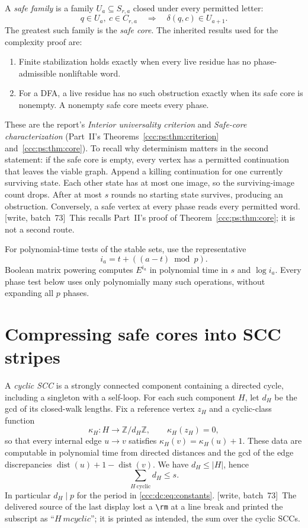 \documentclass[11pt,letterpaper]{article}
\theoremstyle{definition}
\theoremstyle{remark}
\newcommand{\wsevthree}{\textup{[write, batch~73]}}
\begin{document}
A \emph{safe family} is a family $U_a\subseteq S_{r,a}$ closed under every permitted letter:
\[
q\in U_a,\ c\in C_{r,a}\quad\Longrightarrow\quad\delta(q,c)\in U_{a+1}.
\]
The greatest such family is the \emph{safe core}. The inherited results used for the complexity proof are:
\begin{enumerate}
\item Finite stabilization holds exactly when every live residue has no phase-admissible nonliftable word.
\item For a DFA, a live residue has no such obstruction exactly when its safe core is nonempty. A nonempty safe core meets every phase.
\end{enumerate}
These are the report's \emph{Interior universality criterion} and \emph{Safe-core characterization} (Part~II's Theorems~\ref{ccc:ps:thm:criterion} and~\ref{ccc:ps:thm:core}). To recall why determinism matters in the second statement: if the safe core is empty, every vertex has a permitted continuation that leaves the viable graph. Append a killing continuation for one currently surviving state. Each other state has at most one image, so the surviving-image count drops. After at most $s$ rounds no starting state survives, producing an obstruction. Conversely, a safe vertex at every phase reads every permitted word.
\wsevthree\ This recalls Part~II's proof of Theorem~\ref{ccc:ps:thm:core}; it is
not a second route.

For polynomial-time tests of the stable sets, use the representative
\[
i_a=t+((a-t)\bmod p).
\]
Boolean matrix powering computes $E^{i_a}$ in polynomial time in $s$ and $\log i_a$. Every phase test below uses only polynomially many such operations, without expanding all $p$ phases.

\section{Compressing safe cores into SCC stripes}\label{ccc:dc:sec:stripes}

A \emph{cyclic SCC} is a strongly connected component containing a directed cycle, including a singleton with a self-loop. For each such component $H$, let $d_H$ be the gcd of its closed-walk lengths. Fix a reference vertex $z_H$ and a cyclic-class function
\[
\kappa_H:H\to\mathbb Z/d_H\mathbb Z,\qquad\kappa_H(z_H)=0,
\]
so that every internal edge $u\to v$ satisfies $\kappa_H(v)=\kappa_H(u)+1$. These data are computable in polynomial time from directed distances and the gcd of the edge discrepancies $\operatorname{dist}(u)+1-\operatorname{dist}(v)$. We have $d_H\le|H|$, hence
\begin{equation}\label{ccc:dc:eq:stripe-count}
\sum_{H\ \mathrm{cyclic}}d_H\le s.
\end{equation}
In particular $d_H\mid p$ for the period in \eqref{ccc:dc:eq:constants}.
\wsevthree\ The delivered source of the last display lost a \verb|\rm| at a
line break and printed the subscript as ``$H\ mcyclic$''; it is printed as
intended, the sum over the cyclic SCCs.
\end{document}
